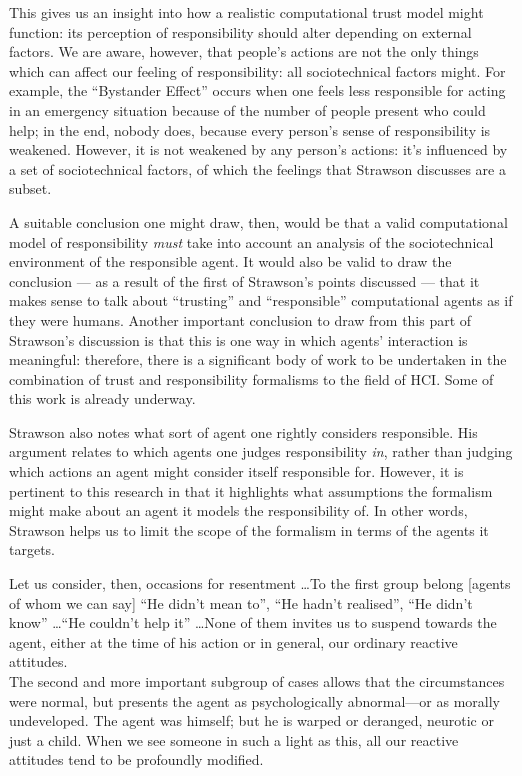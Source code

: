 This gives us an insight into how a realistic computational trust model might function: its perception of responsibility should alter depending on external factors. We are aware, however, that people's actions are not the only things which can affect our feeling of responsibility: all sociotechnical factors might. For example, the ``Bystander Effect''\cite{unresponsive_bystander} occurs when one feels less responsible for acting in an emergency situation because of the number of people present who could help; in the end, nobody does, because every person's sense of responsibility is weakened. However, it is not weakened by any person's actions: it's influenced by a set of sociotechnical factors, of which the feelings that Strawson discusses are a subset.\par

A suitable conclusion one might draw, then, would be that a valid computational model of responsibility \emph{must} take into account an analysis of the sociotechnical environment of the responsible agent. It would also be valid to draw the conclusion --- as a result of the first of Strawson's points discussed --- that it makes sense to talk about ``trusting'' and ``responsible'' computational agents as if they were humans. Another important conclusion to draw from this part of Strawson's discussion is that this is one way in which agents' interaction is meaningful: therefore, there is a significant body of work to be undertaken in the combination of trust and responsibility formalisms to the field of HCI\@. Some of this work is already underway\cite{Marsh2011, Macy2002}. \par

Strawson also notes what sort of agent one rightly considers responsible. His argument relates to which agents one judges responsibility \emph{in}, rather than judging which actions an agent might consider itself responsible for. However, it is pertinent to this research in that it highlights what assumptions the formalism might make about an agent it models the responsibility of. In other words, Strawson helps us to limit the scope of the formalism in terms of the agents it targets.\par

\begin{displayquote}
    Let us consider, then, occasions for resentment \ldots{}To the first group belong [agents of whom we can say] ``He didn't mean to'', ``He hadn't realised'', ``He didn't know'' \ldots{}``He couldn't help it'' \ldots{}None of them invites us to suspend towards the agent, either at the time of his action or in general, our ordinary reactive attitudes.\\
    The second and more important subgroup of cases allows that the circumstances were normal, but presents the agent as psychologically abnormal—or as morally undeveloped. The agent was himself; but he is warped or deranged, neurotic or just a child. When we see someone in such a light as this, all our reactive attitudes tend to be profoundly modified.\\
\end{displayquote}\cite{strawson}

